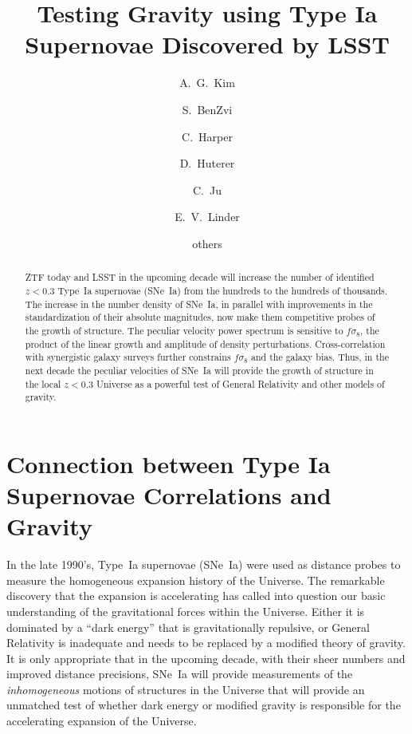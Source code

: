 \documentclass{aastex62}   	%
\begin{document}
\title{Testing Gravity using Type Ia Supernovae Discovered by LSST}
\author[0000-0001-6315-8743]{A.~G.~Kim}
\author{S.~BenZvi}
\author{C.~Harper}
\author{D.~Huterer}
\author{C.~Ju}
\author{E.~V.~Linder}

\author{others}


\begin{abstract}
ZTF today and LSST in the upcoming decade will increase the number of identified  $z<0.3$ Type~Ia supernovae (SNe~Ia)  from the hundreds to the
hundreds of thousands.  The increase in the number density of SNe~Ia, in parallel with improvements in the standardization of
their absolute magnitudes, now make them competitive probes of the growth of structure.  The peculiar velocity power spectrum
is sensitive to $f\sigma_8$,
the product of the linear growth and amplitude of density perturbations.  Cross-correlation with synergistic galaxy surveys further constrains $f \sigma_8$ and the galaxy bias. 
Thus, in the next decade the peculiar velocities of
SNe~Ia will provide the growth of structure  in the local $z<0.3$ Universe as a powerful test of General Relativity and other models of gravity.
\end{abstract}

\section{Connection between Type Ia Supernovae Correlations and Gravity}

In the late 1990's, Type~Ia supernovae (SNe~Ia) were used as distance probes to measure the homogeneous expansion history of the Universe.  The remarkable discovery
that the expansion is accelerating  has called into question our basic understanding of the gravitational forces within the Universe.  Either it
is dominated by a ``dark energy'' that is gravitationally repulsive, or General Relativity is inadequate and needs to be replaced by a modified theory of
gravity.  It is only appropriate that in the upcoming decade, with their sheer numbers and improved distance precisions, SNe~Ia will provide measurements of the {\it inhomogeneous} motions of structures in the Universe
that will provide an unmatched test of whether dark energy or modified gravity is responsible for the accelerating expansion of the Universe.
\end{document}
